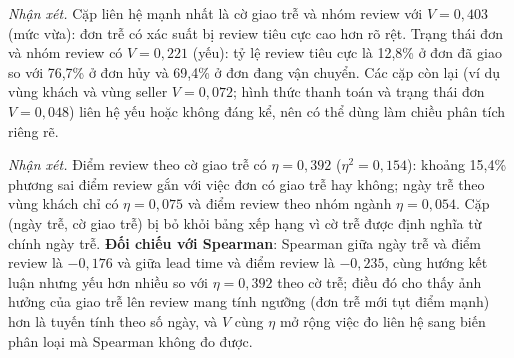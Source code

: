 
\emph{Nhận xét.} Cặp liên hệ mạnh nhất là cờ giao trễ và nhóm review với $V = 0{,}403$ (mức vừa): đơn trễ có xác suất bị review tiêu cực cao hơn rõ rệt. Trạng thái đơn và nhóm review có $V = 0{,}221$ (yếu): tỷ lệ review tiêu cực là 12,8\% ở đơn đã giao so với 76,7\% ở đơn hủy và 69,4\% ở đơn đang vận chuyển. Các cặp còn lại (ví dụ vùng khách và vùng seller $V = 0{,}072$; hình thức thanh toán và trạng thái đơn $V = 0{,}048$) liên hệ yếu hoặc không đáng kể, nên có thể dùng làm chiều phân tích riêng rẽ.

\emph{Nhận xét.} Điểm review theo cờ giao trễ có $\eta = 0{,}392$ ($\eta^2 = 0{,}154$): khoảng 15,4\% phương sai điểm review gắn với việc đơn có giao trễ hay không; ngày trễ theo vùng khách chỉ có $\eta = 0{,}075$ và điểm review theo nhóm ngành $\eta = 0{,}054$. Cặp (ngày trễ, cờ giao trễ) bị bỏ khỏi bảng xếp hạng vì cờ trễ được định nghĩa từ chính ngày trễ. \textbf{Đối chiếu với Spearman}: Spearman giữa ngày trễ và điểm review là $-0{,}176$ và giữa lead time và điểm review là $-0{,}235$, cùng hướng kết luận nhưng yếu hơn nhiều so với $\eta = 0{,}392$ theo cờ trễ; điều đó cho thấy ảnh hưởng của giao trễ lên review mang tính ngưỡng (đơn trễ mới tụt điểm mạnh) hơn là tuyến tính theo số ngày, và $V$ cùng $\eta$ mở rộng việc đo liên hệ sang biến phân loại mà Spearman không đo được.

